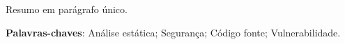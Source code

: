 \begin{resumo}

Resumo em parágrafo único.

 \vspace{\onelineskip}
    
 \noindent
 \textbf{Palavras-chaves}: Análise estática; Segurança; Código fonte; Vulnerabilidade.
\end{resumo}
